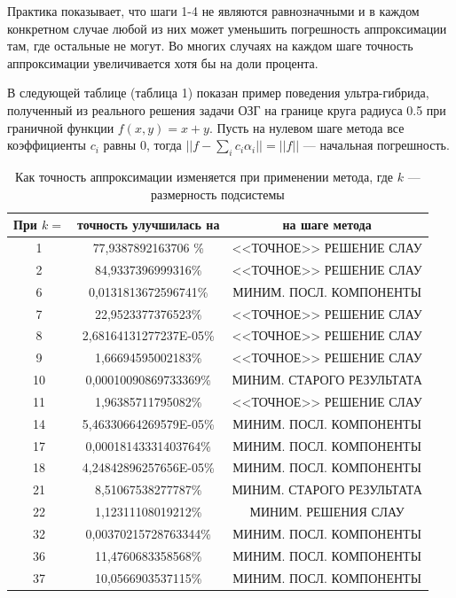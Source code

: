 \documentclass[a4paper]{article}
\begin{document}
Практика показывает, что шаги 1-4 не являются равнозначными и в каждом конкретном случае любой из них может уменьшить погрешность аппроксимации там, где остальные не могут.
Во многих случаях на каждом шаге точность аппроксимации увеличивается хотя бы на доли процента.

В следующей таблице (таблица 1) показан пример поведения ультра-гибрида, полученный из реального решения задачи ОЗГ на границе круга радиуса 0.5 при граничной функции $f(x,y)=x+y$.
Пусть на нулевом шаге метода все коэффициенты $c_i$ равны 0, тогда $||f-\sum_i c_i \alpha_i||=||f||$ --- начальная погрешность.

\begin{table}[h]
 
  \label{tabl}
  \caption{Как точность аппроксимации изменяется при применении метода, где $k$ --- размерность подсистемы}
\begin{center}
\begin{tabular}[t]{|c|c|c|}
  \hline
  При $k=$ & точность улучшилась на & на шаге метода \\
  \hline
  1 & 77,9387892163706 \% & <<ТОЧНОЕ>> РЕШЕНИЕ СЛАУ \\
  2 & 84,9337396999316\% & <<ТОЧНОЕ>> РЕШЕНИЕ СЛАУ\\
6& 0,0131813672596741\% &МИНИМ. ПОСЛ. КОМПОНЕНТЫ\\
7& 22,9523377376523\% &<<ТОЧНОЕ>> РЕШЕНИЕ СЛАУ\\
8& 2,68164131277237E-05\% &<<ТОЧНОЕ>> РЕШЕНИЕ СЛАУ \\
9& 1,66694595002183\% &<<ТОЧНОЕ>> РЕШЕНИЕ СЛАУ \\
10& 0,00010090869733369\% & МИНИМ. СТАРОГО РЕЗУЛЬТАТА\\
11& 1,96385711795082\% & <<ТОЧНОЕ>> РЕШЕНИЕ СЛАУ\\
14&  5,46330664269579E-05\% &МИНИМ. ПОСЛ. КОМПОНЕНТЫ\\
17& 0,00018143331403764\% & МИНИМ. ПОСЛ. КОМПОНЕНТЫ\\
18& 4,24842896257656E-05\% &МИНИМ. ПОСЛ. КОМПОНЕНТЫ\\
21& 8,51067538277787\% & МИНИМ. СТАРОГО РЕЗУЛЬТАТА \\
22& 1,12311108019212\% & МИНИМ. РЕШЕНИЯ СЛАУ\\
32&  0,00370215728763344\% & МИНИМ. ПОСЛ. КОМПОНЕНТЫ\\
36& 11,4760683358568\% & МИНИМ. ПОСЛ. КОМПОНЕНТЫ \\
37& 10,0566903537115\% & МИНИМ. ПОСЛ. КОМПОНЕНТЫ\\

\end{tabular}
\end{center}
\end{table}
\end{document}
